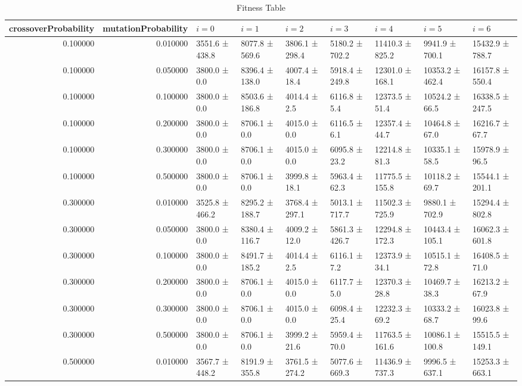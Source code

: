 \begin{table}
\caption{Fitness Table}
\label{tab:fitness_table}
\begin{tabular}{rrlllllll}
\toprule
crossoverProbability & mutationProbability & \(i = 0\) & \(i = 1\) & \(i = 2\) & \(i = 3\) & \(i = 4\) & \(i = 5\) & \(i = 6\) \\
\midrule
0.100000 & 0.010000 & 3551.6 ± 438.8 & 8077.8 ± 569.6 & 3806.1 ± 298.4 & 5180.2 ± 702.2 & 11410.3 ± 825.2 & 9941.9 ± 700.1 & 15432.9 ± 788.7 \\
0.100000 & 0.050000 & 3800.0 ± 0.0 & 8396.4 ± 138.0 & 4007.4 ± 18.4 & 5918.4 ± 249.8 & 12301.0 ± 168.1 & 10353.2 ± 462.4 & 16157.8 ± 550.4 \\
0.100000 & 0.100000 & 3800.0 ± 0.0 & 8503.6 ± 186.8 & 4014.4 ± 2.5 & 6116.8 ± 5.4 & 12373.5 ± 51.4 & 10524.2 ± 66.5 & 16338.5 ± 247.5 \\
0.100000 & 0.200000 & 3800.0 ± 0.0 & 8706.1 ± 0.0 & 4015.0 ± 0.0 & 6116.5 ± 6.1 & 12357.4 ± 44.7 & 10464.8 ± 67.0 & 16216.7 ± 67.7 \\
0.100000 & 0.300000 & 3800.0 ± 0.0 & 8706.1 ± 0.0 & 4015.0 ± 0.0 & 6095.8 ± 23.2 & 12214.8 ± 81.3 & 10335.1 ± 58.5 & 15978.9 ± 96.5 \\
0.100000 & 0.500000 & 3800.0 ± 0.0 & 8706.1 ± 0.0 & 3999.8 ± 18.1 & 5963.4 ± 62.3 & 11775.5 ± 155.8 & 10118.2 ± 69.7 & 15544.1 ± 201.1 \\
0.300000 & 0.010000 & 3525.8 ± 466.2 & 8295.2 ± 188.7 & 3768.4 ± 297.1 & 5013.1 ± 717.7 & 11502.3 ± 725.9 & 9880.1 ± 702.9 & 15294.4 ± 802.8 \\
0.300000 & 0.050000 & 3800.0 ± 0.0 & 8380.4 ± 116.7 & 4009.2 ± 12.0 & 5861.3 ± 426.7 & 12294.8 ± 172.3 & 10443.4 ± 105.1 & 16062.3 ± 601.8 \\
0.300000 & 0.100000 & 3800.0 ± 0.0 & 8491.7 ± 185.2 & 4014.4 ± 2.5 & 6116.1 ± 7.2 & 12373.9 ± 34.1 & 10515.1 ± 72.8 & 16408.5 ± 71.0 \\
0.300000 & 0.200000 & 3800.0 ± 0.0 & 8706.1 ± 0.0 & 4015.0 ± 0.0 & 6117.7 ± 5.0 & 12370.3 ± 28.8 & 10469.7 ± 38.3 & 16213.2 ± 67.9 \\
0.300000 & 0.300000 & 3800.0 ± 0.0 & 8706.1 ± 0.0 & 4015.0 ± 0.0 & 6098.4 ± 25.4 & 12232.3 ± 69.2 & 10333.2 ± 68.7 & 16023.8 ± 99.6 \\
0.300000 & 0.500000 & 3800.0 ± 0.0 & 8706.1 ± 0.0 & 3999.2 ± 21.6 & 5959.4 ± 70.0 & 11763.5 ± 161.6 & 10086.1 ± 100.8 & 15515.5 ± 149.1 \\
0.500000 & 0.010000 & 3567.7 ± 448.2 & 8191.9 ± 355.8 & 3761.5 ± 274.2 & 5077.6 ± 669.3 & 11436.9 ± 737.3 & 9996.5 ± 637.1 & 15253.3 ± 663.1 \\

\end{tabular}
\end{table}
